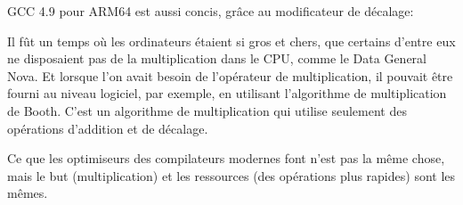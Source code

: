 









GCC 4.9 pour ARM64 est aussi concis, grâce au modificateur de décalage:




Il fût un temps où les ordinateurs étaient si gros et chers, que certains d'entre
eux ne disposaient pas de la multiplication dans le \ac{CPU}, comme le Data General Nova.
Et lorsque l'on avait besoin de l'opérateur de multiplication, il pouvait être fourni
au niveau logiciel, par exemple, en utilisant l'algorithme de multiplication de Booth.
C'est un algorithme de multiplication qui utilise seulement des opérations d'addition
et de décalage.

Ce que les optimiseurs des compilateurs modernes font n'est pas la même chose, mais
le but (multiplication) et les ressources (des opérations plus rapides) sont les mêmes.
